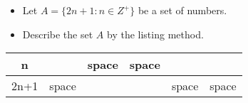 \documentclass[11pt,a4paper,titlepage,oneside,openany]{article}
\numberwithin{equation}{section}
\numberwithin{algorithm}{section}
\numberwithin{figure}{section}
\numberwithin{table}{section}
\begin{document}
\begin{itemize}
\item Let $A = \{2n+1 : n \in Z^{+}\}$ be a set of numbers.
\item Describe the set $A$ by the listing method.
\end{itemize} 
\begin{center}
\begin{tabular}{|c|c|c|c|c|c|}
\hline n &  &{\color{white} space}  & {\color{white} space} &  &  \\ 
\hline 2n+1 &{\color{white} space}  &  &  & {\color{white} space} &{\color{white} space}  \\ 
\hline 
\end{tabular} 
\end{center}

\end{document}
